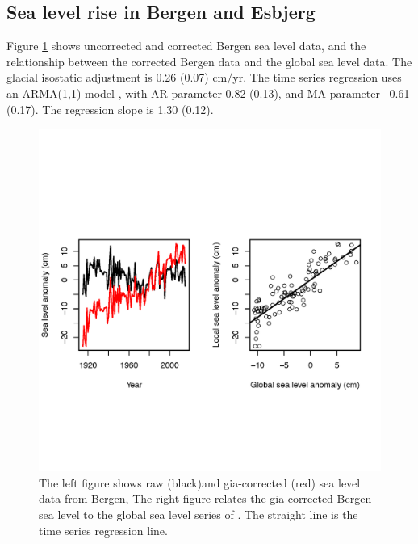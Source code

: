 \documentclass[draft,linenumbers]{agujournal}
\begin{document}
\subsection{Sea level rise in Bergen and Esbjerg}

Figure \ref{fig:bergenobs} shows uncorrected and corrected Bergen sea level data, and the relationship between the corrected Bergen data and the global sea level data. The glacial isostatic adjustment is 0.26 (0.07) cm/yr. The time series regression uses an ARMA(1,1)-model \citep{boxjenkins}, with AR parameter 0.82 (0.13), and MA parameter --0.61 (0.17). The regression slope is 1.30 (0.12).
\begin{figure}
\begin{center}
\includegraphics[width=\linewidth]{bergenfit.png}
\caption{ The left figure shows raw (black)and gia-corrected (red) sea level data from Bergen, The right figure relates the gia-corrected Bergen sea level to the global sea level series of \citet{csiro}. The straight line is the time series regression line.}
\label{fig:bergenobs}
\end{center}
\end{figure}
\end{document}
